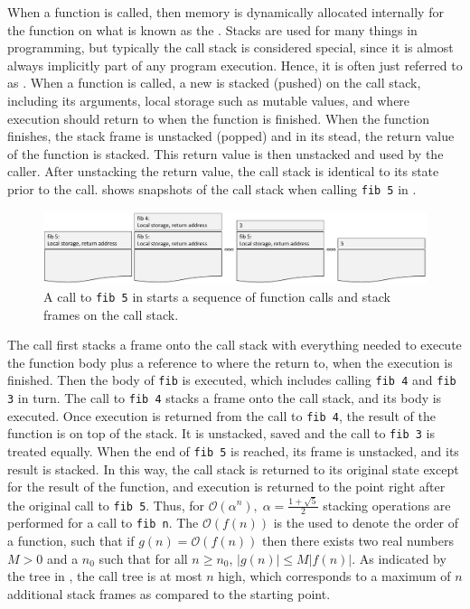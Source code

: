 \documentclass[fsharpNotes.tex]{subfiles}
\begin{document}
When a function is called, then memory is dynamically allocated internally for the function on what is known as the . Stacks are used for many things in programming, but typically the call stack is considered special, since it is almost always implicitly part of any program execution. Hence, it is often just referred to as . When a function is called, a new  is stacked (pushed) on the call stack, including its arguments, local storage such as mutable values, and where execution should return to when the function is finished. When the function finishes, the stack frame is unstacked (popped) and in its stead, the return value of the function is stacked. This return value is then unstacked and used by the caller. After unstacking the return value, the call stack is identical to its state prior to the call.  shows snapshots of the call stack when calling \lstinline{fib 5} in . 
\begin{figure}
  \centering
  \includegraphics[width=\textwidth]{TheCallStack}
  \caption{A call to \lstinline{fib 5} in  starts a sequence of function calls and stack frames on the call stack.}
  \label{fig:TheStack}
\end{figure}
The call first stacks a frame onto the call stack with everything needed to execute the function body plus a reference to where the return to, when the execution is finished. Then the body of \lstinline{fib} is executed, which includes calling \lstinline{fib 4} and \lstinline{fib 3} in turn. The call to \lstinline{fib 4} stacks a frame onto the call stack, and its body is executed. Once execution is returned from the call to \lstinline{fib 4}, the result of the function is on top of the stack. It is unstacked, saved and the call to \lstinline{fib 3} is treated equally. When the end of \lstinline{fib 5} is reached, its frame is unstacked, and its result is stacked. In this way, the call stack is returned to its original state except for the result of the function, and execution is returned to the point right after the original call to \lstinline{fib 5}. Thus, for  $\mathcal{O}\left(\alpha^n\right),\; \alpha=\frac{1+\sqrt{5}}{2}$ stacking operations are performed for a call to \lstinline{fib n}. The $\mathcal{O}\left(f(n)\right)$ is the  used to denote the order of a function, such that if $g(n) = \mathcal{O}(f(n))$ then there exists two real numbers $M>0$ and a $n_0$ such that for all $n\geq n_0$, $|g(n)| \leq M |f(n)|$. As indicated by the tree in , the call tree is at most $n$ high, which corresponds to a maximum of $n$ additional stack frames as compared to the starting point.
\end{document}
